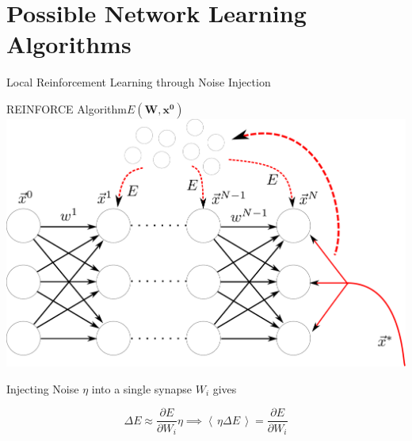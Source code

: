 \documentclass[pdf]{beamer}
\newcommand{\avg}[1]{\mbox{$\left\langle \, #1 \, \right\rangle$}}
\begin{document}
\section{Possible Network Learning Algorithms}
\frame{\sectionpage}


\begin{frame}{Local Reinforcement Learning through Noise Injection}

\begin{center}

REINFORCE Algorithm\quad \quad \quad \quad \quad $E(\mathbf{W},\mathbf{x^0})$\\

\includegraphics[width = .55\textwidth]{fwdError.pdf}

\end{center}


Injecting Noise $\eta$ into a single synapse $W_i$ gives

\begin{equation*}
\Delta E \approx \frac{\partial E}{\partial W_i} \eta \implies \avg{\eta\Delta E } = \frac{\partial E}{\partial W_i}
\end{equation*}
\end{frame}
\end{document}
